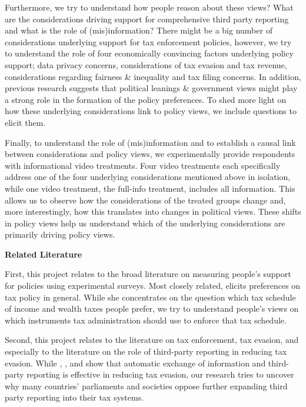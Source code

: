 \documentclass[12pt]{article}
\begin{document}
Furthermore, we try to understand how people reason about these views? What are the considerations driving support for comprehensive third party reporting and what is the role of (mis)information? There might be a big number of considerations underlying support for tax enforcement policies, however, we try to understand the role of four economically convincing factors underlying policy support; data privacy concerns, considerations of tax evasion and tax revenue, considerations regarding fairness \& inequality and tax filing concerns. In addition, previous research suggests that political leanings \& government views might play a strong role in the formation of the policy preferences. To shed more light on how these underlying considerations link to policy views, we include questions to elicit them. 

Finally, to understand the role of (mis)information and to establish a causal link between considerations and policy views, we experimentally provide respondents with informational video treatments. Four video treatments each specifically address one of the four underlying considerations mentioned above in isolation, while one video treatment, the full-info treatment, includes all information. This allows us to observe how the considerations of the treated groups change and, more interestingly, how this translates into changes in political views. These shifts in policy views help us understand which of the underlying considerations are primarily driving policy views. \\[-1.5em]
\begin{center}
\textbf{Related Literature}
\end{center} 
First, this project relates to the broad literature on measuring people's support for policies using experimental surveys. Most closely related, \textcite{stantcheva2021understanding} elicits preferences on tax policy in general. While she concentrates on the question which tax schedule of income and wealth taxes people prefer, we try to understand people's views on which instruments tax administration should use to enforce that tax schedule. 

Second, this project relates to the literature on tax enforcement, tax evasion, and especially to the literature on the role of third-party reporting in reducing tax evasion. While \textcite{kleven2011unwilling}, \textcite{pomeranz2015no}, \textcite{slemrod2017does} and \textcite{boas2024taxing} show that automatic exchange of information and third-party reporting is effective in reducing tax evasion, our research tries to uncover why many countries' parliaments and societies oppose further expanding third party reporting into their tax systems. 
\end{document}
